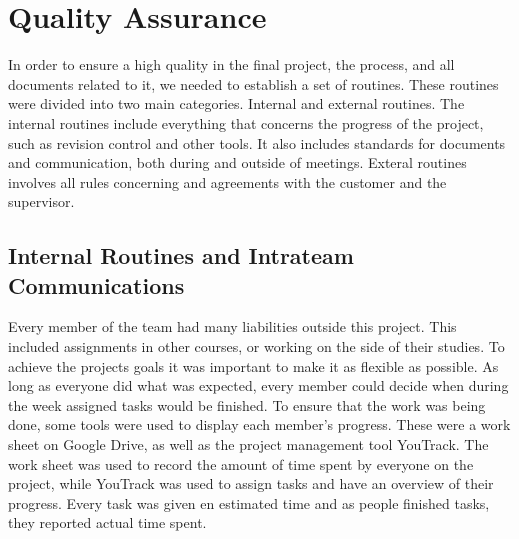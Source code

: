 
\section{Quality Assurance}
\label{sec:PlanningQuality}
In order to ensure a high quality in the final project, the process, and all documents related to it, we needed to establish a set of routines. These routines were divided into two main categories. Internal and external routines. The internal routines include everything that concerns the progress of the project, such as revision control and other tools. It also includes standards for documents and communication, both during and outside of meetings. Exteral routines involves all rules concerning and agreements with the customer and the supervisor.

\subsection{Internal Routines and Intrateam Communications}
\label{subsec:PlanningQualityRoutines}
Every member of the team had many liabilities outside this project. This included assignments in other courses, or working on the side of their studies. To achieve the projects goals it was important to make it as flexible as possible. As long as everyone did what was expected, every member could decide when during the week assigned tasks would be finished. To ensure that the work was being done, some tools were used to display each member's progress. These were a work sheet on Google Drive, as well as the project management tool YouTrack. The work sheet was used to record the amount of time spent by everyone on the project, while YouTrack was used to assign tasks and have an overview of their progress. Every task was given en estimated time and as people finished tasks, they reported actual time spent.

